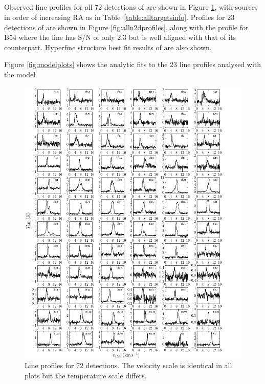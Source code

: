 \documentclass[iop,twocolappendix]{emulateapj}
\begin{document}



\begin{appendix}
\section{}
Observed line profiles for all 72 detections of  {\HCO} are shown in Figure \ref{fig:allhcoprofiles}, with sources in order of increasing RA as in Table~\ref{table:alltargetsinfo}.
%
Profiles for 23 detections of  {\NtD} are shown in Figure \ref{fig:alln2dprofiles}, along with the profile for B54 where the {\NtD} line has S/N of only 2.3 but is well aligned with that of its {\HCO} counterpart. Hyperfine structure best fit results of {\NtD} are also shown.

Figure \ref{fig:modelplots} shows the analytic fits to the 23 {\HCO} line profiles analysed with the {\Hill} model.

\begin{figure}
\includegraphics[width=18.5cm]{AllHCO.pdf}
\caption{Line profiles for 72 {\HCO} detections. The velocity scale is identical in all plots but the temperature scale differs.}
\label{fig:allhcoprofiles}
\end{figure}


\end{appendix}
\end{document}
